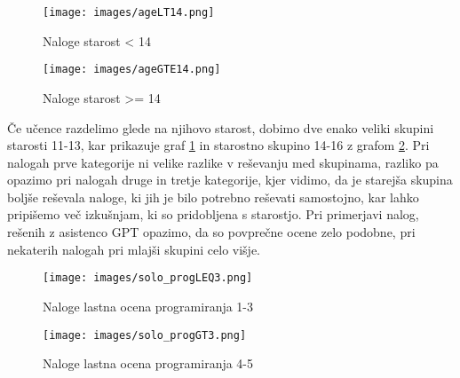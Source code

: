 \documentclass[a4paper,12pt,openright]{book}
\begin{document}
\pagebreak
\begin{figure}[H]
    \centering
    \texttt{[image: images/ageLT14.png]}
    \caption{Naloge starost < 14}
    \label{fig:ageLT14}
\end{figure}

\begin{figure}[H]
    \centering
    \texttt{[image: images/ageGTE14.png]}
    \caption{Naloge starost >= 14}
    \label{fig:ageGTE14}
\end{figure}

Če učence razdelimo glede na njihovo starost, dobimo dve enako veliki skupini starosti 11-13, kar prikazuje graf \ref{fig:ageLT14} in starostno skupino 14-16 z grafom \ref{fig:ageGTE14}. Pri nalogah prve kategorije ni velike razlike v reševanju med skupinama, razliko pa opazimo pri nalogah druge in tretje kategorije, kjer vidimo, da je starejša skupina boljše reševala naloge, ki jih je bilo potrebno reševati samostojno, kar lahko pripišemo več izkušnjam, ki so pridobljena s starostjo. Pri primerjavi nalog, rešenih z asistenco GPT opazimo, da so povprečne ocene zelo podobne, pri nekaterih nalogah pri mlajši skupini celo višje.

\pagebreak

\begin{figure}[H]
    \centering
    \texttt{[image: images/solo\_progLEQ3.png]}
    \caption{Naloge lastna ocena programiranja 1-3}
    \label{fig:ocenaLTE13}
\end{figure}

\begin{figure}[H]
    \centering
    \texttt{[image: images/solo\_progGT3.png]}
    \caption{Naloge lastna ocena programiranja 4-5}
    \label{fig:ocenaGT3}
\end{figure}
\end{document}
